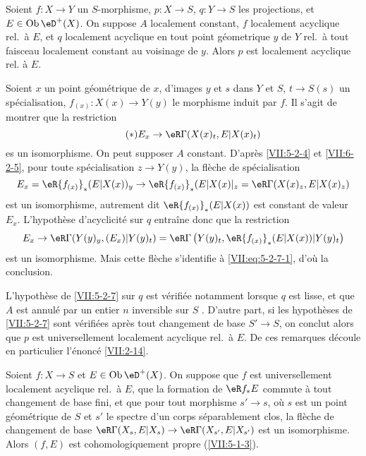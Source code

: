 \begin{corollary}\label{VII:5-2-7}
Soient $f:X\to Y$ un $S$-morphisme, $p:X\to S$, $q:Y\to S$ les projections, et 
$E\in\ob\eD^+(X)$. On suppose $A$ localement constant, $f$ localement acyclique 
rel.\ à $E$, et $q$ localement acyclique en tout point géometrique $y$ de 
$Y$ rel.\ à tout faisceau localement constant au voisinage de $y$. Alors $p$ 
est localement acyclique rel. à $E$. 
\end{corollary}

Soient $x$ un point géométrique de $x$, d'images $y$ et $s$ dans $Y$ et 
$S$, $t\to S(s)$ un spécialisation, $f_{(x)}:X(x)\to Y(y)$ le morphisme 
induit par $f$. Il s'agit de montrer que la restriction 
\begin{equation*}\tag{$*$}\label{VII:eq:5-2-7-1}
  E_x \to \eR\Gamma(X(x)_t,E|X(x)_t) 
\end{equation*}
es un isomorphisme. On peut supposer $A$ constant. D'après \ref{VII:5-2-4} et 
\ref{VII:6-2-5}, pour toute spécialisation $z\to Y(y)$, la flèche de 
spécialisation 
\[
  E_x = \eR {f_{(x)}}_\ast (E|X(x))_y \to \eR {f_{(x)}}_\ast (E|X(x)|_z = \eR\Gamma(X(x)_z,E|X(x)_z) 
\]
est un isomorphisme, autrement dit $\eR{f_{(x)}}_\ast(E|X(x))$ est constant de 
valeur $E_x$. L'hypothèse d'acyclicité sur $q$ entra\^ine donc que la 
restriction 
\[
  E_x \to \eR\Gamma(Y(y)_y,(E_x)|Y(y)_t) = \eR\Gamma\left(Y(y)_t,\eR {f_{(x)}}_\ast (E|X(x))|Y(y)_t\right)
\]
est un isomorphisme. Mais cette flèche s'identifie à 
\eqref{VII:eq:5-2-7-1}, d'où la conclusion. 

L'hypothèse de \ref{VII:5-2-7} sur $q$ est vérifiée notamment lorsque $q$ 
est lisse, et que $A$ est annulé par un entier $n$ inversible sur $S$ 
\cite[XV]{sga4}. D'autre part, si les hypothèses de \ref{VII:5-2-7} sont 
vérifiées après tout changement de base $S'\to S$, on conclut alors que 
$p$ est universellement localement acyclique rel.\ à $E$. De ces remarques 
découle en particulier l'énoncé \ref{VII:2-14}. 





\begin{corollary}\label{VII:5-2-8}
Soient $f:X\to S$ et $E\in \ob\eD^+(X)$. On suppose que $f$ est universellement 
localement acyclique rel.\ à $E$, que la formation de $\eR f_\ast E$ commute 
à tout changement de base fini, et que pour tout morphisme $s'\to s$, où 
$s$ est un point géométrique de $S$ et $s'$ le spectre d'un corps 
séparablement clos, la flèche de changement de base 
$\eR\Gamma(X_s,E|X_s)\to \eR\Gamma(X_{s'},E|X_{s'})$ est un isomorphisme. 
Alors $(f,E)$ est cohomologiquement propre (\ref{VII:5-1-3}). 
\end{corollary}


